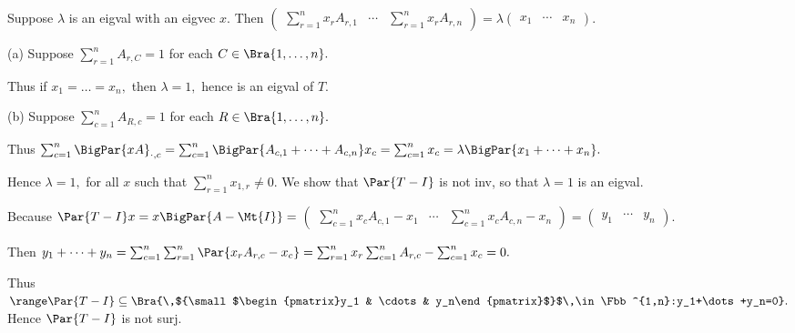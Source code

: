 \par\quad
Suppose $\lambda$ is an eigval with an eigvec $x.$ Then {\normalsize$\begin{pmatrix} \sum_{r=1}^n x_r A_{r,1} &\cdots & \sum_{r=1}^n x_r A_{r,n}\end{pmatrix}$}${}=\lambda${\normalsize$\begin{pmatrix} x_1 & \cdots & x_n\end{pmatrix}$}.\vspace{4pt}\par\quad
(a) Suppose $\sum_{r=1}^n A_{r,C}=1$ for each $C\in\Bra{1,\dots,n}.$\par\quad\Ha
Thus if $x_1=\dots=x_n,$ then $\lambda=1,$ hence is an eigval of $T.$\vspace{4pt}\par\quad
(b) Suppose $\sum_{c=1}^n A_{R,c}=1$ for each $R\in\Bra{1,\dots,n}.$\vspace{2pt}\par\quad\Hb
Thus $\sum_{c=1}^n \BigPar{xA}_{\cdot,c}=\sum_{c=1}^n\BigPar{A_{c,1}+\dots+A_{c,n}}x_c=\sum_{c=1}^n x_c=\lambda\BigPar{x_1+\dots+x_n}.$\vspace{2pt}\par\quad\Hb
Hence $\lambda=1,$ for all $x$ such that $\sum_{r=1}^n x_{1,r}\neq 0.$\PfEnd\vspace{6pt}\quad\Hb
\Or We show that $\Par{T-I}$ is not inv, so that $\lambda=1$ is an eigval.\par\quad\Hb
Because $\Par{T-I}x=x\BigPar{A-\Mt{I}}={}${\normalsize$\begin{pmatrix} \sum_{c=1}^n x_c A_{c,1}-x_1 &\cdots & \sum_{c=1}^n x_c A_{c,n}-x_n\end{pmatrix}$}${}={}${\normalsize$\begin{pmatrix} y_1 & \cdots & y_n\end{pmatrix}$}.\vspace{2pt}\par\quad\Hb
Then $y_1+\dots+y_n=\sum_{c=1}^n\sum_{r=1}^n\Par{x_r A_{r,c}-x_c}=\sum_{r=1}^n x_r\sum_{c=1}^n A_{r,c}-\sum_{c=1}^n x_c=0.$\par\vspace{4pt}\quad\Hb
Thus $\range\Par{T-I}\subseteq\Bra{\,${\small$\begin{pmatrix}y_1 & \cdots & y_n\end{pmatrix}$}$\,\in\Fbb^{1,n}:y_1+\dots+y_n=0}.$ Hence $\Par{T-I}$ is not surj.\PfEnd\vspace{6pt}\quad\Hb
